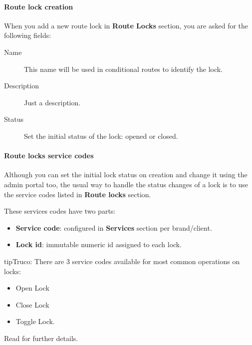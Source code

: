 \documentclass[letterpaper,10pt,spanish]{sphinxmanual}
\begin{document}
\paragraph{Route lock creation}
\label{administration_portal/client/vpbx/routing_tools/route_locks:route-lock-creation}
When you add a new route lock in \textbf{Route Locks} section, you are asked for the following fields:
\begin{description}
\item[{Name}] \leavevmode{}\label{administration_portal/client/vpbx/routing_tools/route_locks:term-name}
This name will be used in conditional routes to identify the lock.

\item[{Description}] \leavevmode{}\label{administration_portal/client/vpbx/routing_tools/route_locks:term-description}
Just a description.

\item[{Status}] \leavevmode{}\label{administration_portal/client/vpbx/routing_tools/route_locks:term-status}
Set the initial status of the lock: opened or closed.

\end{description}


\paragraph{Route locks service codes}
\label{administration_portal/client/vpbx/routing_tools/route_locks:route-locks-service-codes}
Although you can set the initial lock status on creation and change it using the admin portal too, the usual way to
handle the status changes of a lock is to use the service codes listed in \textbf{Route locks} section.

These services codes have two parts:
\begin{itemize}
\item {} 
\textbf{Service code}: configured in \textbf{Services} section per brand/client.

\item {} 
\textbf{Lock id}: immutable numeric id assigned to each lock.

\end{itemize}

\begin{notice}{tip}{Truco:}
There are 3 service codes available for most common operations on locks:
\begin{itemize}
\item {} 
Open Lock

\item {} 
Close Lock

\item {} 
Toggle Lock.

\end{itemize}

Read {\hyperref[administration_portal/platform/services:services]{}} for further details.
\end{notice}
\end{document}
